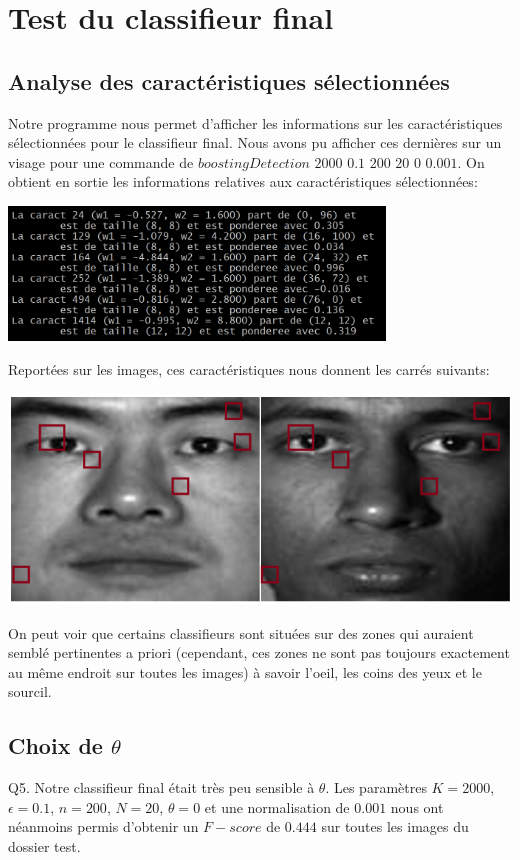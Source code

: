 \documentclass[a4paper,11pt]{article}
\begin{document}
\section{Test du classifieur final}
\subsection{Analyse des caractéristiques sélectionnées}
Notre programme nous permet d'afficher les informations sur les caractéristiques sélectionnées pour le classifieur final. Nous avons pu afficher ces dernières sur un visage pour une commande de $\textit{boostingDetection 2000 0.1 200 20 0 0.001}$. On obtient en sortie les informations relatives aux caractéristiques sélectionnées:
\begin{center}
  \includegraphics[width=10cm]{"Caracteristiques"}
\end{center}
Reportées sur les images, ces caractéristiques nous donnent les carrés suivants:
\begin{center}
  \includegraphics[width=15cm]{"Cars visage"}
\end{center}
On peut voir que certains classifieurs sont situées sur des zones qui auraient semblé pertinentes a priori (cependant, ces zones ne sont pas toujours exactement au même endroit sur toutes les images) à savoir l'oeil, les coins des yeux et le sourcil.\\

\subsection{Choix de $\theta$}
Q5. Notre classifieur final était très peu sensible à $\theta$. Les paramètres $K=2000$, $\epsilon = 0.1$, $n = 200$, $N = 20$, $\theta = 0$ et une normalisation de $0.001$ nous ont néanmoins permis d’obtenir un $F-score$ de $0.444$ sur toutes les images du dossier test.\\
\end{document}
